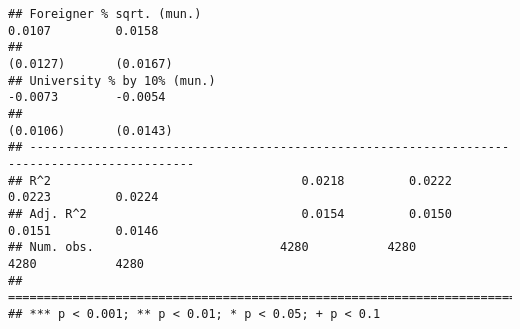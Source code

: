 \documentclass[
]{article}
\begin{document}
\begin{verbatim}
## Foreigner % sqrt. (mun.)                                            0.0107         0.0158    
##                                                                    (0.0127)       (0.0167)   
## University % by 10% (mun.)                                         -0.0073        -0.0054    
##                                                                    (0.0106)       (0.0143)   
## ---------------------------------------------------------------------------------------------
## R^2                                   0.0218         0.0222         0.0223         0.0224    
## Adj. R^2                              0.0154         0.0150         0.0151         0.0146    
## Num. obs.                          4280           4280           4280           4280         
## =============================================================================================
## *** p < 0.001; ** p < 0.01; * p < 0.05; + p < 0.1
\end{verbatim}
\end{document}
